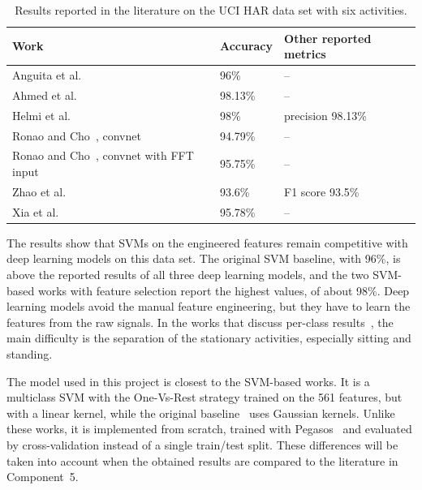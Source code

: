 \documentclass[a4paper, 11pt]{article}
\begin{document}
\begin{table}[ht]
\centering
\small
\renewcommand{\arraystretch}{1.4}
\begin{tabular}{@{}lll@{}}
\toprule
\textbf{Work} & \textbf{Accuracy} & \textbf{Other reported metrics} \\
\midrule
Anguita et al.~\cite{anguita2013} & 96\% & -- \\
\midrule
Ahmed et al.~\cite{ahmed2020} & 98.13\% & -- \\
\midrule
Helmi et al.~\cite{helmi2021} & 98\% & precision 98.13\% \\
\midrule
Ronao and Cho~\cite{ronao2016}, convnet & 94.79\% & -- \\
\midrule
Ronao and Cho~\cite{ronao2016}, convnet with FFT input & 95.75\% & -- \\
\midrule
Zhao et al.~\cite{zhao2018} & 93.6\% & F1 score 93.5\% \\
\midrule
Xia et al.~\cite{xia2020} & 95.78\% & -- \\
\bottomrule
\end{tabular}
\caption{Results reported in the literature on the UCI HAR data set with six activities.}
\label{tab:results}
\end{table}

The results show that SVMs on the engineered features remain competitive with deep learning models on this data set. The original SVM baseline, with 96\%, is above the reported results of all three deep learning models, and the two SVM-based works with feature selection report the highest values, of about 98\%. Deep learning models avoid the manual feature engineering, but they have to learn the features from the raw signals. In the works that discuss per-class results~\cite{anguita2013,helmi2021,ronao2016}, the main difficulty is the separation of the stationary activities, especially sitting and standing.

The model used in this project is closest to the SVM-based works. It is a multiclass SVM with the One-Vs-Rest strategy trained on the 561 features, but with a linear kernel, while the original baseline~\cite{anguita2013} uses Gaussian kernels. Unlike these works, it is implemented from scratch, trained with Pegasos~\cite{Shalev-Shwartz2011} and evaluated by cross-validation instead of a single train/test split. These differences will be taken into account when the obtained results are compared to the literature in Component~5.



\end{document}
